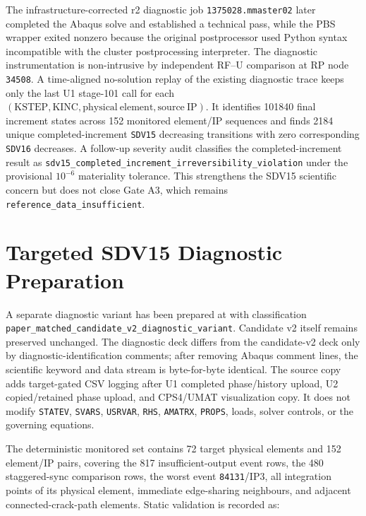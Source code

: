 \documentclass[11pt,a4paper]{article}
\begin{document}
The infrastructure-corrected r2 diagnostic job \texttt{1375028.mmaster02} later
completed the Abaqus solve and established a technical pass, while the PBS
wrapper exited nonzero because the original postprocessor used Python syntax
incompatible with the cluster postprocessing interpreter. The diagnostic
instrumentation is non-intrusive by independent RF--U comparison at RP node
\texttt{34508}. A time-aligned no-solution replay of the existing diagnostic
trace keeps only the last U1 stage-101 call for each
\((\mathrm{KSTEP},\mathrm{KINC},\mathrm{physical\ element},\mathrm{source\ IP})\).
It identifies 101840 final increment states across 152 monitored element/IP
sequences and finds 2184 unique completed-increment \texttt{SDV15} decreasing
transitions with zero corresponding \texttt{SDV16} decreases. A follow-up
severity audit classifies the completed-increment result as
\texttt{sdv15\_completed\_increment\_irreversibility\_violation} under the
provisional \(10^{-6}\) materiality tolerance. This strengthens the SDV15
scientific concern but does not close Gate A3, which remains
\texttt{reference\_data\_insufficient}.

\section{Targeted SDV15 Diagnostic Preparation}

A separate diagnostic variant has been prepared at  with classification \texttt{paper\_matched\_candidate\_v2\_diagnostic\_variant}. Candidate v2 itself remains preserved unchanged. The diagnostic deck differs from the candidate-v2 deck only by diagnostic-identification comments; after removing Abaqus comment lines, the scientific keyword and data stream is byte-for-byte identical. The source copy adds target-gated CSV logging after U1 completed phase/history upload, U2 copied/retained phase upload, and CPS4/UMAT visualization copy. It does not modify \texttt{STATEV}, \texttt{SVARS}, \texttt{USRVAR}, \texttt{RHS}, \texttt{AMATRX}, \texttt{PROPS}, loads, solver controls, or the governing equations.

The deterministic monitored set contains 72 target physical elements and 152 element/IP pairs, covering the 817 insufficient-output event rows, the 480 staggered-sync comparison rows, the worst event \texttt{84131}/IP3, all integration points of its physical element, immediate edge-sharing neighbours, and adjacent connected-crack-path elements. Static validation is recorded as:
\end{document}
